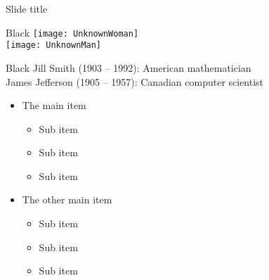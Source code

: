 \documentclass{MichiganTech}
\begin{document}
%
\begin{frame}{Slide title}
  \vspace*{0.10in}
  \begin{reference}{108mm}{12mm}{Black}
    \texttt{[image: UnknownWoman]}\\
    \texttt{[image: UnknownMan]}
  \end{reference}
  \begin{reference}{4mm}{82mm}{Black}
    Jill Smith (1903 -- 1992): American mathematician\\
    James Jefferson (1905 -- 1957): Canadian computer scientist
  \end{reference}

  \begin{itemize}
    \item The main item
          \begin{itemize}
            \item Sub item
            \item Sub item
            \item Sub item
          \end{itemize}
    \pause
    \item The other main item
          \begin{itemize}
            \item Sub item
            \item Sub item
            \item Sub item
          \end{itemize}
  \end{itemize}
\end{frame}
\end{document}
